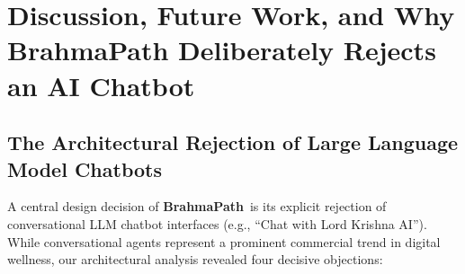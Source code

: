 \documentclass[11pt,a4paper]{article}
\newcommand{\AppName}{\textbf{BrahmaPath}}
\begin{document}
\section{Discussion, Future Work, and Why BrahmaPath Deliberately Rejects an AI Chatbot}

\subsection{The Architectural Rejection of Large Language Model Chatbots}
A central design decision of \AppName\ is its explicit rejection of conversational LLM chatbot interfaces (e.g., ``Chat with Lord Krishna AI''). While conversational agents represent a prominent commercial trend in digital wellness, our architectural analysis revealed four decisive objections:
\end{document}
